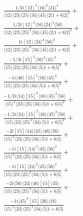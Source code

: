 \documentclass[varwidth, border=5pt]{standalone}
\begin{document}
\begin{my}
$\begin{gathered}
\scriptscriptstyle\frac{1/3i[12]^3⟨16⟩^2⟨24⟩^4}{⟨12⟩⟨23⟩⟨25⟩⟨34⟩⟨45⟩⟨2|1+6|2]^3}+\\
\scriptscriptstyle\frac{1/2i[12]^2⟨16⟩⟨24⟩^4⟨56⟩}{⟨12⟩⟨23⟩⟨25⟩^2⟨34⟩⟨45⟩⟨2|1+6|2]^2}+\\
\scriptscriptstyle\frac{1i[12]⟨24⟩^4⟨56⟩^2}{⟨12⟩⟨23⟩⟨25⟩^3⟨34⟩⟨45⟩⟨2|1+6|2]}+\\
\scriptscriptstyle\frac{-1/3i[15]^3⟨16⟩^2⟨45⟩^3}{⟨15⟩⟨23⟩⟨25⟩⟨34⟩⟨5|1+6|5]^3}+\\
\scriptscriptstyle\frac{-1i⟨46⟩[15]^2⟨16⟩⟨45⟩^2}{⟨15⟩⟨23⟩⟨25⟩⟨34⟩⟨5|1+6|5]^2}+\\
\scriptscriptstyle\frac{-1/2i⟨14⟩[15]^2⟨16⟩⟨45⟩^2⟨56⟩}{⟨15⟩^2⟨23⟩⟨25⟩⟨34⟩⟨5|1+6|5]^2}+\\
\scriptscriptstyle\frac{-1/2i⟨24⟩[15]^2⟨16⟩⟨45⟩^2⟨56⟩}{⟨15⟩⟨23⟩⟨25⟩^2⟨34⟩⟨5|1+6|5]^2}+\\
\scriptscriptstyle\frac{-2i[15]⟨14⟩⟨45⟩⟨46⟩⟨56⟩}{⟨15⟩^2⟨23⟩⟨25⟩⟨34⟩⟨5|1+6|5]}+\\
\scriptscriptstyle\frac{-1i[15]⟨14⟩^2⟨45⟩⟨56⟩^2}{⟨15⟩^3⟨23⟩⟨25⟩⟨34⟩⟨5|1+6|5]}+\\
\scriptscriptstyle\frac{-1i[15]⟨24⟩^2⟨45⟩⟨56⟩^2}{⟨15⟩⟨23⟩⟨25⟩^3⟨34⟩⟨5|1+6|5]}+\\
\scriptscriptstyle\frac{-2i⟨56⟩⟨24⟩⟨46⟩[15]⟨45⟩}{⟨15⟩⟨23⟩⟨25⟩^2⟨34⟩⟨5|1+6|5]}+\\
\scriptscriptstyle\frac{-1i⟨45⟩^3[15]⟨26⟩⟨16⟩}{⟨15⟩^2⟨23⟩⟨25⟩^2⟨34⟩⟨5|1+6|5]}\phantom{+}
\end{gathered}$
\end{my}
\end{document}
